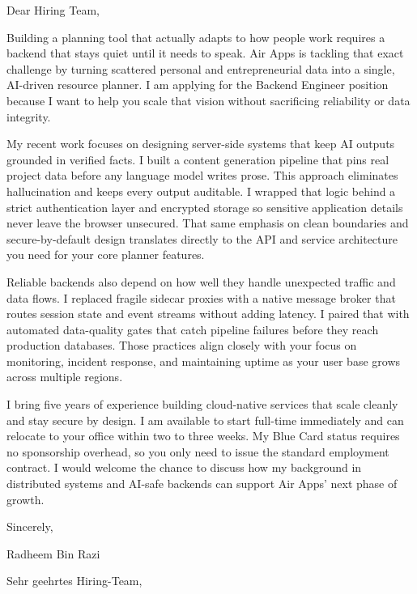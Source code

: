 \documentclass[11pt,a4paper]{coverletter}
\begin{document}

\opening{Dear Hiring Team,}

Building a planning tool that actually adapts to how people work requires a backend that stays quiet until it needs to speak. Air Apps is tackling that exact challenge by turning scattered personal and entrepreneurial data into a single, AI-driven resource planner. I am applying for the Backend Engineer position because I want to help you scale that vision without sacrificing reliability or data integrity.

My recent work focuses on designing server-side systems that keep AI outputs grounded in verified facts. I built a content generation pipeline that pins real project data before any language model writes prose. This approach eliminates hallucination and keeps every output auditable. I wrapped that logic behind a strict authentication layer and encrypted storage so sensitive application details never leave the browser unsecured. That same emphasis on clean boundaries and secure-by-default design translates directly to the API and service architecture you need for your core planner features.

Reliable backends also depend on how well they handle unexpected traffic and data flows. I replaced fragile sidecar proxies with a native message broker that routes session state and event streams without adding latency. I paired that with automated data-quality gates that catch pipeline failures before they reach production databases. Those practices align closely with your focus on monitoring, incident response, and maintaining uptime as your user base grows across multiple regions.

I bring five years of experience building cloud-native services that scale cleanly and stay secure by design. I am available to start full-time immediately and can relocate to your office within two to three weeks. My Blue Card status requires no sponsorship overhead, so you only need to issue the standard employment contract. I would welcome the chance to discuss how my background in distributed systems and AI-safe backends can support Air Apps' next phase of growth.

\closing{Sincerely,}{Radheem Bin Razi}

\clearpage
{}


\opening{Sehr geehrtes Hiring-Team,}
\end{document}
